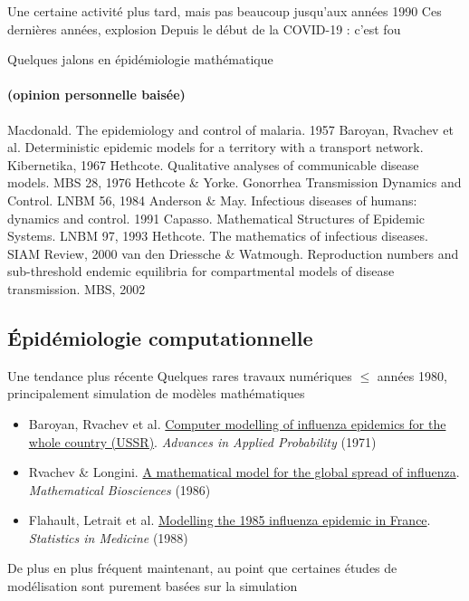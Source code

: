 \documentclass[aspectratio=169]{beamer}\usepackage[]{graphicx}\usepackage[]{xcolor}
\begin{document}
    
\begin{frame}{Une certaine activité plus tard, mais pas beaucoup jusqu'aux années 1990}
\bbullet Ces dernières années, explosion
\vfill
\bbullet Depuis le début de la COVID-19 : c'est fou
\end{frame}

\begin{frame}{Quelques jalons en épidémiologie mathématique}
\framesubtitle{(opinion personnelle baisée)}
\bbullet Macdonald. The epidemiology and control of malaria. 1957
\vfill
\bbullet Baroyan, Rvachev et al. Deterministic epidemic models for a territory with a transport network. Kibernetika, 1967 \nocite{BaroyanRvachev1967}
\vfill Hethcote. Qualitative analyses of communicable disease models. MBS 28, 1976 \nocite{Hethcote1976}
\vfill
\bbullet Hethcote \& Yorke. Gonorrhea Transmission Dynamics and Control. LNBM 56, 1984 \nocite{HethcoteYorke1984}
\vfill
\bbullet Anderson \& May. Infectious diseases of humans: dynamics and control. 1991 \nocite{AndersonMay1991}
\vfill
\bbullet Capasso. Mathematical Structures of Epidemic Systems. LNBM 97, 1993
\vfill
\bbullet Hethcote. The mathematics of infectious diseases. SIAM Review, 2000 \nocite{Hethcote2000}
\vfill
\bbullet van den Driessche \& Watmough. Reproduction numbers and sub-threshold endemic equilibria for compartmental models of disease transmission. MBS, 2002 \nocite{VdDWatmough2002}  
\end{frame}


\subsection{Épidémiologie computationnelle}


\begin{frame}{Une tendance plus récente}
\bbullet Quelques rares travaux numériques $\leq$ années 1980, principalement simulation de modèles mathématiques
\begin{itemize}
    \item Baroyan, Rvachev et al. \href{https://doi.org/10.2307/1426167}{Computer modelling of influenza epidemics for the whole country (USSR)}. \emph{Advances in Applied Probability} (1971) \nocite{BaroyanRvachevBasilevskyEzmakovEtAl1971}
    \item Rvachev \& Longini. \href{https://doi.org/10.1016/0025-5564(85)90064-1}{A mathematical model for the global spread of influenza}. \emph{Mathematical Biosciences} (1986) 
    \item Flahault, Letrait et al. \href{https://doi.org/10.1002/sim.4780071107}{Modelling the 1985 influenza epidemic in France}. \emph{Statistics in Medicine} (1988)
\end{itemize}
\vfill
\bbullet De plus en plus fréquent maintenant, au point que certaines études de modélisation sont purement basées sur la simulation
\end{frame}
\end{document}
